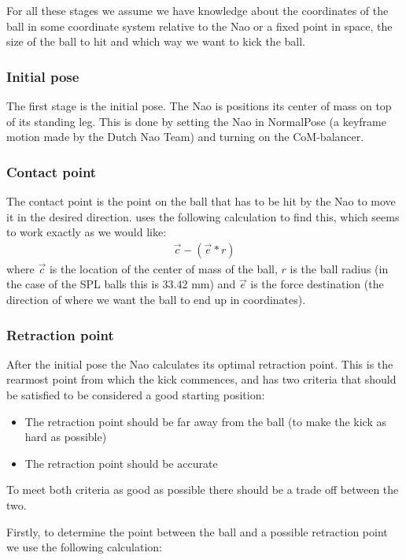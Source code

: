 \documentclass[a4paper]{article}
\begin{document}
For all these stages we assume we have knowledge about the coordinates of the
ball in some coordinate system relative to the Nao or a fixed point in space,
the size of the ball to hit and which way we want to kick the ball.

\subsubsection{Initial pose}
The first stage is the initial pose. The Nao is positions its center of mass on
top of its standing leg. This is done by setting the Nao in NormalPose (a
keyframe motion made by the Dutch Nao Team) and
turning on the CoM-balancer.

\subsubsection{Contact point}
The contact point is the point on the ball that has to be hit by the Nao to
move it in the desired direction. \cite{Xu2010} uses the following
calculation to find this, which seems to work exactly as we would like:
\begin{align*}
    \vec{c} - ( \vec{e} * r )
\end{align*}
where $\vec{c}$ is the location of the center of mass of the ball, $r$ is the
ball radius (in the case of the SPL balls this is 33.42 mm) and $\vec{e}$ is the
force destination (the direction of where we want the ball to end up in
coordinates).


\subsubsection{Retraction point}
After the initial pose the Nao calculates its optimal retraction point. This
is the rearmost point from which the kick commences, and has two criteria that
should be satisfied to be considered a good starting position:
\begin{itemize}
    \item The retraction point should be far away from the ball (to make the
        kick as hard as possible)
    \item The retraction point should be accurate 
\end{itemize}
To meet both criteria as good as possible there should be a trade off between
the two.

Firstly, to determine the point between the ball and a possible retraction point
we use the following calculation: 
\end{document}
